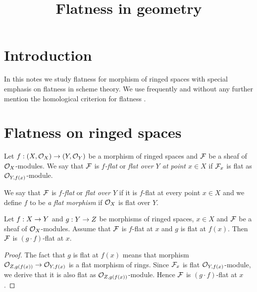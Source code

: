 



\title{Flatness in geometry}
\date{}
\maketitle

\section{Introduction}
\noindent
In this notes we study flatness for morphism of ringed spaces with special emphasis on flatness in scheme theory. We use frequently and without any further mention the homological criterion for flatness {\cite[Proposition 3.3]{Flatness}}.

\section{Flatness on ringed spaces}

\begin{definition}
Let $f:(X,{\mathcal O}_X)\rightarrow (Y,{\mathcal O}_Y)$ be a morphism of ringed spaces and ${\mathcal F}$ be a sheaf of ${\mathcal O}_X$-modules. We say that ${\mathcal F}$ is \textit{$f$-flat} or \textit{flat over $Y$ at point $x\in X$} if ${\mathcal F}_x$ is flat as ${\mathcal O}_{Y,f(x)}$-module.
\end{definition}

\begin{definition}
We say that ${\mathcal F}$ is \textit{$f$-flat} or \textit{flat over $Y$} if it is $f$-flat at every point $x\in X$ and we define $f$ to be \textit{a flat morphism} if ${\mathcal O}_X$ is flat over $Y$.
\end{definition}

\begin{proposition}[Transitivity]
Let $f:X\rightarrow Y$ and $g:Y\rightarrow Z$ be morphisms of ringed spaces, $x\in X$ and ${\mathcal F}$ be a sheaf of ${\mathcal O}_X$-modules. Assume that ${\mathcal F}$ is $f$-flat at $x$ and $g$ is flat at $f(x)$. Then ${\mathcal F}$ is $(g\cdot f)$-flat at $x$.
\end{proposition}
\begin{proof}
The fact that $g$ is flat at $f(x)$ means that morphism ${\mathcal O}_{Z,g(f(x))}\rightarrow {\mathcal O}_{Y,f(x)}$ is a flat morphism of rings. Since ${\mathcal F}_x$ is flat ${\mathcal O}_{Y,f(x)}$-module, we derive that it is also flat as ${\mathcal O}_{Z,g(f(x))}$-module. Hence ${\mathcal F}$ is $(g\cdot f)$-flat at $x$.
\end{proof}

